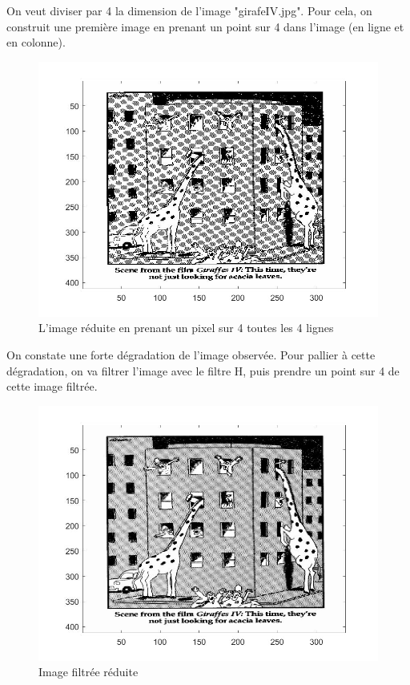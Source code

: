 \documentclass[10pt,a4paper]{article}
\begin{document}
On veut diviser par 4 la dimension de l'image "girafeIV.jpg". Pour cela, on construit une première image en prenant un point sur 4 dans l’image (en ligne et en colonne).


\begin{figure}[H]	\begin{center}
\includegraphics[scale=0.35]{girafe_reduite.jpg}
\caption{L'image réduite en prenant un pixel sur 4 toutes les 4 lignes}
\label{s1demod}
\end{center}	\end{figure}


On constate une forte dégradation de l'image observée. Pour pallier à cette dégradation, on va filtrer l'image avec le filtre H, puis prendre un point sur 4 de cette image filtrée.

\begin{figure}[H]	\begin{center}
\includegraphics[scale=0.35]{imfiltree_reduite.jpg}
\caption{Image filtrée réduite	}
\label{s1demod}
\end{center}	\end{figure}
\end{document}
